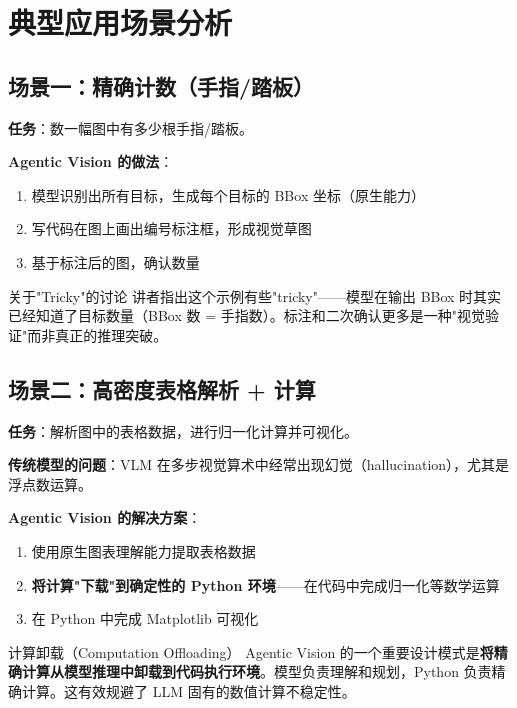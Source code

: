 \section{典型应用场景分析}

\subsection{场景一：精确计数（手指/踏板）}

\textbf{任务}：数一幅图中有多少根手指/踏板。

\textbf{Agentic Vision 的做法}：
\begin{enumerate}
    \item 模型识别出所有目标，生成每个目标的 BBox 坐标（原生能力）
    \item 写代码在图上画出编号标注框，形成视觉草图
    \item 基于标注后的图，确认数量
\end{enumerate}

\begin{warningbox}{关于"Tricky"的讨论}
讲者指出这个示例有些"tricky"——模型在输出 BBox 时其实已经知道了目标数量（BBox 数 = 手指数）。标注和二次确认更多是一种"视觉验证"而非真正的推理突破。
\end{warningbox}

\subsection{场景二：高密度表格解析 + 计算}

\textbf{任务}：解析图中的表格数据，进行归一化计算并可视化。

\textbf{传统模型的问题}：VLM 在多步视觉算术中经常出现幻觉（hallucination），尤其是浮点数运算。

\textbf{Agentic Vision 的解决方案}：
\begin{enumerate}
    \item 使用原生图表理解能力提取表格数据
    \item \textbf{将计算"下载"到确定性的 Python 环境}——在代码中完成归一化等数学运算
    \item 在 Python 中完成 Matplotlib 可视化
\end{enumerate}

\begin{importantbox}{计算卸载（Computation Offloading）}
Agentic Vision 的一个重要设计模式是\textbf{将精确计算从模型推理中卸载到代码执行环境}。模型负责理解和规划，Python 负责精确计算。这有效规避了 LLM 固有的数值计算不稳定性。
\end{importantbox}

